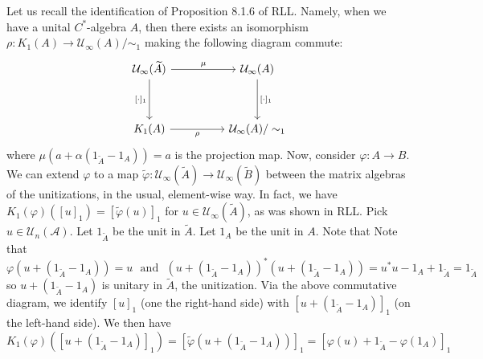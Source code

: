 \documentclass[aps,pra,showpacs,notitlepage,onecolumn,superscriptaddress,nofootinbib]{revtex4-1}
\theoremstyle{definition}
\begin{document}
\noindent Let us recall the identification of Proposition 8.1.6 of RLL. Namely, when we have a unital $C^{*}$-algebra $A$, then there exists an isomorphism $\rho : K_1(A) \rightarrow \mathcal{U}_{\infty}(A)/\sim_1$ making the
following diagram commute:
\[\begin{tikzcd}
	          {\mathcal{U}_{\infty}(\widetilde{A})} && {\mathcal{U}_{\infty}(A)} \\
	          \\
	            {K_1(A)} && {\mathcal{U}_{\infty}(A)/\sim_1}
	            \arrow["\mu", from=1-1, to=1-3]
	            \arrow["{[\cdot]_1}", from=1-3, to=3-3]
	            \arrow["{[\cdot]_1}"', from=1-1, to=3-1]
	            \arrow["\rho"', from=3-1, to=3-3]
\end{tikzcd}\]
where $\mu(a + \alpha (1_{\widetilde{A}} - 1_A)) = a$ is the projection map. Now, consider $\varphi : A \rightarrow B$. We can extend $\varphi$ to a map $\widetilde{\varphi} : \mathcal{U}_{\infty}(\widetilde{A}) \rightarrow \mathcal{U}_{\infty}(\widetilde{B})$
between the matrix algebras of the unitizations, in the usual, element-wise way. In fact, we have $K_1(\varphi)([u]_1) = [\widetilde{\varphi}(u)]_1$ for $u \in \mathcal{U}_{\infty}(\widetilde{A})$, as was shown in RLL. Pick $u \in \mathcal{U}_n(\mathcal{A})$.
Let $1_{\widetilde{A}}$ be the unit in $\widetilde{A}$. Let $1_A$ be the unit in $A$. Note that
Note that
\begin{equation}
  \varphi(u + (1_{\widetilde{A}} - 1_A)) = u \ \ \ \text{and} \ \ \ (u + (1_{\widetilde{A}} - 1_A))^{*} (u + (1_{\widetilde{A}} - 1_A)) = u^{*} u - 1_{A} + 1_{\widetilde{A}} = 1_{\widetilde{A}}
\end{equation}
so $u + (1_{\widetilde{A}} - 1_A)$ is unitary in $\widetilde{A}$, the unitization. Via the above commutative diagram, we identify $[u]_1$ (one the right-hand side) with $[u + (1_{\widetilde{A}} - 1_A)]_1$ (on the left-hand side).
We then have
\begin{equation}
  K_1(\varphi)([u + (1_{\widetilde{A}} - 1_A)]_1) = [\widetilde{\varphi}(u + (1_{\widetilde{A}} - 1_A))]_1 = [\varphi(u) + 1_{\widetilde{A}} - \varphi(1_A)]_1
\end{equation}
\end{document}
